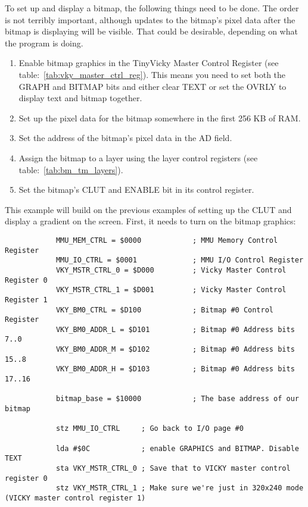 To set up and display a bitmap, the following things need to be done. The order is not terribly important, although updates to the bitmap's pixel data after the bitmap is displaying will be visible. That could be desirable, depending on what the program is doing.

\begin{enumerate}
    \item Enable bitmap graphics in the TinyVicky Master Control Register (see table:~\ref{tab:vky_master_ctrl_reg}). This means you need to set both the GRAPH and BITMAP bits and either clear TEXT or set the OVRLY to display text and bitmap together.

    \item Set up the pixel data for the bitmap somewhere in the first 256 KB of RAM.

    \item Set the address of the bitmap's pixel data in the AD field.

    \item Assign the bitmap to a layer using the layer control registers (see table:~\ref{tab:bm_tm_layers}).

    \item Set the bitmap's CLUT and ENABLE bit in its control register.
\end{enumerate}


This example will build on the previous examples of setting up the CLUT and display a gradient on the screen. First, it needs to turn on the bitmap graphics:

\begin{verbatim}
            MMU_MEM_CTRL = $0000            ; MMU Memory Control Register
            MMU_IO_CTRL = $0001             ; MMU I/O Control Register
            VKY_MSTR_CTRL_0 = $D000         ; Vicky Master Control Register 0
            VKY_MSTR_CTRL_1 = $D001         ; Vicky Master Control Register 1
            VKY_BM0_CTRL = $D100            ; Bitmap #0 Control Register
            VKY_BM0_ADDR_L = $D101          ; Bitmap #0 Address bits 7..0
            VKY_BM0_ADDR_M = $D102          ; Bitmap #0 Address bits 15..8
            VKY_BM0_ADDR_H = $D103          ; Bitmap #0 Address bits 17..16

            bitmap_base = $10000            ; The base address of our bitmap

            stz MMU_IO_CTRL     ; Go back to I/O page #0

            lda #$0C            ; enable GRAPHICS and BITMAP. Disable TEXT
            sta VKY_MSTR_CTRL_0 ; Save that to VICKY master control register 0
            stz VKY_MSTR_CTRL_1 ; Make sure we're just in 320x240 mode (VICKY master control register 1)
\end{verbatim}

